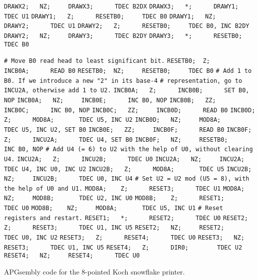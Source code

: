 \begin{apgsembly}
\begin{minipage}[t]{.49\textwidth}
\begin{algorithmic}
			\State \verb|DRAWX2;   NZ;     DRAWX3;      TDEC B2DX|
			\State \verb|DRAWX3;   *;      DRAWY1;      TDEC U1|
			\State \verb|DRAWY1;   Z;      RESETB0;     TDEC B0|
			\State \verb|DRAWY1;   NZ;     DRAWY2;      TDEC U1|
			\State \verb|DRAWY2;   Z;      RESETB0;     TDEC B0, INC B2DY|
			\State \verb|DRAWY2;   NZ;     DRAWY3;      TDEC B2DY|
			\State \verb|DRAWY3;   *;      RESETB0;     TDEC B0|
		\end{algorithmic}
	\end{minipage}\hfill{\color{gray}\vline}\hfill
	\begin{minipage}[t]{.49\textwidth}
		\begin{algorithmic}\tiny
			\State \verb|# Move B0 read head to least significant bit.|
			\State \verb|RESETB0;  Z;      INCB0A;      READ B0|
			\State \verb|RESETB0;  NZ;     RESETB0;     TDEC B0|
			\State
			\State \verb|# Add 1 to B0. If we introduce a new "2" in its base-4|
			\State \verb|# representation, go to INCU2A, otherwise add 1 to U2.|
			\State \verb|INCB0A;   Z;      INCB0B;      SET B0, NOP|
			\State \verb|INCB0A;   NZ;     INCB0E;      INC B0, NOP|
			\State \verb|INCB0B;   ZZ;     INCB0C;      INC B0, NOP|
			\State \verb|INCB0C;   ZZ;     INCB0D;      READ B0|
			\State \verb|INCB0D;   Z;      MOD8A;       TDEC U5, INC U2|
			\State \verb|INCB0D;   NZ;     MOD8A;       TDEC U5, INC U2, SET B0|
			\State \verb|INCB0E;   ZZ;     INCB0F;      READ B0|
			\State \verb|INCB0F;   Z;      INCU2A;      TDEC U4, SET B0|
			\State \verb|INCB0F;   NZ;     RESETB0;     INC B0, NOP|
			\State
			\State \verb|# Add U4 (= 6) to U2 with the help of U0, without clearing U4.|
			\State \verb|INCU2A;   Z;      INCU2B;      TDEC U0|
			\State \verb|INCU2A;   NZ;     INCU2A;      TDEC U4, INC U0, INC U2|
			\State \verb|INCU2B;   Z;      MOD8A;       TDEC U5|
			\State \verb|INCU2B;   NZ;     INCU2B;      TDEC U0, INC U4|
			\State
			\State \verb|# Set U2 = U2 mod (U5 = 8), with the help of U0 and U1.|
			\State \verb|MOD8A;    Z;      RESET3;      TDEC U1|
			\State \verb|MOD8A;    NZ;     MOD8B;       TDEC U2, INC U0|
			\State \verb|MOD8B;    Z;      RESET1;      TDEC U0|
			\State \verb|MOD8B;    NZ;     MOD8A;       TDEC U5, INC U1|
			\State
			\State \verb|# Reset registers and restart.|
			\State \verb|RESET1;   *;      RESET2;      TDEC U0|
			\State \verb|RESET2;   Z;      RESET3;      TDEC U1, INC U5|
			\State \verb|RESET2;   NZ;     RESET2;      TDEC U0, INC U2|
			\State \verb|RESET3;   Z;      RESET4;      TDEC U0|
			\State \verb|RESET3;   NZ;     RESET3;      TDEC U1, INC U5|
			\State \verb|RESET4;   Z;      DIR0;        TDEC U2|
			\State \verb|RESET4;   NZ;     RESET4;      TDEC U0|
		\end{algorithmic}
	\end{minipage}
	\caption{APGsembly code for the $8$-pointed Koch snowflake printer.}\label{alg:apgsembly_koch}
\end{apgsembly}

